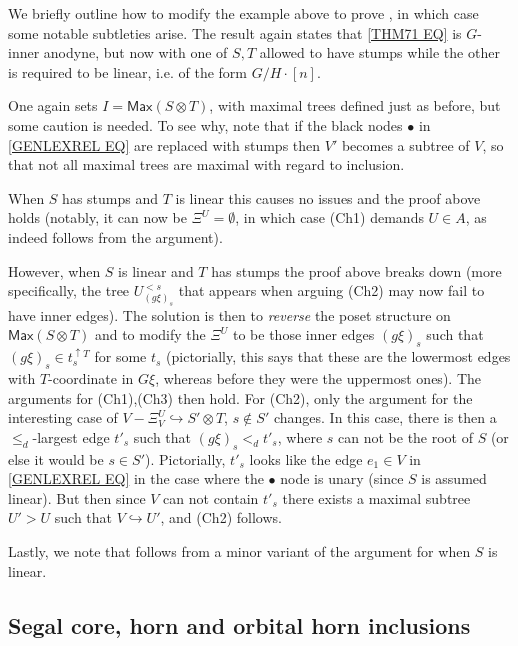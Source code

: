 \documentclass[a4paper,10pt
 ,draft
]{article}%
\begin{document}
 
\begin{remark}
We briefly outline how to modify the example above to prove 
\cite[Thm 7.1(ii)]{Per18}, in which case some notable subtleties arise.
The result again states that \eqref{THM71 EQ} is $G$-inner anodyne, but now with one of $S,T$ allowed to have stumps while the other is required to be linear, i.e. of the form $G/H \cdot [n]$.

One again sets $I=\mathsf{Max}(S\otimes T)$, with maximal trees defined just as before, but some caution is needed.
To see why, note that if the black nodes $\bullet$ in \eqref{GENLEXREL EQ} are replaced with stumps then $V'$
becomes a subtree of $V$, so that not all maximal trees are maximal with regard to inclusion.

When $S$ has stumps and $T$ is linear this causes no issues and the proof above holds
(notably, it can now be 
$\Xi^U = \emptyset$, in which case (Ch1) demands $U \in A$,
as indeed follows from the argument).

However, when $S$ is linear and $T$ has stumps the proof above breaks down (more specifically, the tree $U_{(g\xi)_s}^{<s}$ that appears when arguing (Ch2) may now fail to have inner edges). The solution is then to \textit{reverse} the poset structure on 
$\mathsf{Max}(S\otimes T)$
and to modify the $\Xi^U$ to be those inner edges $(g \xi)_s$ such that
$(g \xi)_s \in t_s^{\uparrow T}$ for some $t_s$
(pictorially, this says that these are the lowermost edges with $T$-coordinate in $G\xi$, whereas before they were the uppermost ones). The arguments for (Ch1),(Ch3) then hold.
For (Ch2), only the argument for the interesting case of
$V- \Xi_V^U \hookrightarrow S' \otimes T$, $s \not \in S'$
changes. In this case, there is then a $\leq_d$-largest edge $t'_s$ such that $(g \xi)_s <_d t'_s$, where $s$ can not be the root of $S$ (or else it would be $s \in S'$). Pictorially, $t'_s$ looks like the edge $e_1 \in V$ in \eqref{GENLEXREL EQ} in the case where the $\bullet$ node is unary (since $S$ is assumed linear). But then since $V$ can not contain $t'_s$ there exists a maximal subtree $U' > U$ such that $V \hookrightarrow U'$,
and (Ch2) follows.

Lastly, we note that \cite[Thm. 7.2]{Per18} follows from a minor variant of the argument for \cite[Thm. 7.1(ii)]{Per18} when $S$ is linear.
\end{remark}



\subsection{Segal core, horn and orbital horn inclusions}\label{HYPERSAT SEC}
\end{document}
